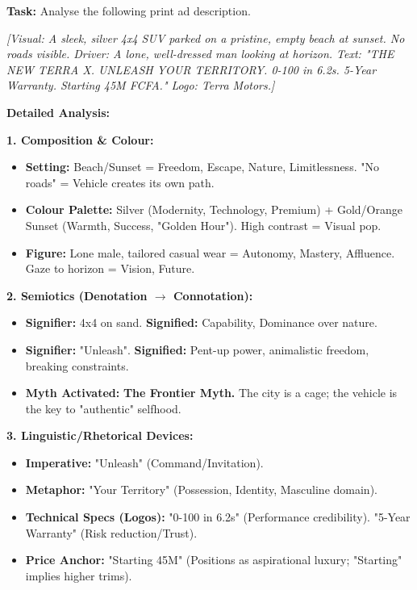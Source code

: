 \documentclass[11pt]{article}
\newcommand{\cle}[1]{{\popxbold\color{popdark}#1}}
\begin{document}
\begin{exoresolu}
\textbf{Task:} Analyse the following print ad description.

\textit{[Visual: A sleek, silver 4x4 SUV parked on a pristine, empty beach at sunset. No roads visible. Driver: A lone, well-dressed man looking at horizon. Text: "THE NEW TERRA X. UNLEASH YOUR TERRITORY. 0-100 in 6.2s. 5-Year Warranty. Starting 45M FCFA." Logo: Terra Motors.]}

\tcblower
\textbf{Detailed Analysis:}

\textbf{1. Composition \& Colour:}
\begin{itemize}
    \item \textbf{Setting:} Beach/Sunset = \cle{Freedom, Escape, Nature, Limitlessness}. "No roads" = Vehicle creates its own path.
    \item \textbf{Colour Palette:} Silver (Modernity, Technology, Premium) + Gold/Orange Sunset (Warmth, Success, "Golden Hour"). High contrast = Visual pop.
    \item \textbf{Figure:} Lone male, tailored casual wear = \cle{Autonomy, Mastery, Affluence}. Gaze to horizon = \cle{Vision, Future}.
\end{itemize}

\textbf{2. Semiotics (Denotation $\rightarrow$ Connotation):}
\begin{itemize}
    \item \textbf{Signifier:} 4x4 on sand. \textbf{Signified:} Capability, Dominance over nature.
    \item \textbf{Signifier:} "Unleash". \textbf{Signified:} Pent-up power, animalistic freedom, breaking constraints.
    \item \textbf{Myth Activated:} \textbf{The Frontier Myth.} The city is a cage; the vehicle is the key to "authentic" selfhood.
\end{itemize}

\textbf{3. Linguistic/Rhetorical Devices:}
\begin{itemize}
    \item \textbf{Imperative:} "Unleash" (Command/Invitation).
    \item \textbf{Metaphor:} "Your Territory" (Possession, Identity, Masculine domain).
    \item \textbf{Technical Specs (Logos):} "0-100 in 6.2s" (Performance credibility). "5-Year Warranty" (Risk reduction/Trust).
    \item \textbf{Price Anchor:} "Starting 45M" (Positions as aspirational luxury; "Starting" implies higher trims).
\end{itemize}


\end{exoresolu}
\end{document}
